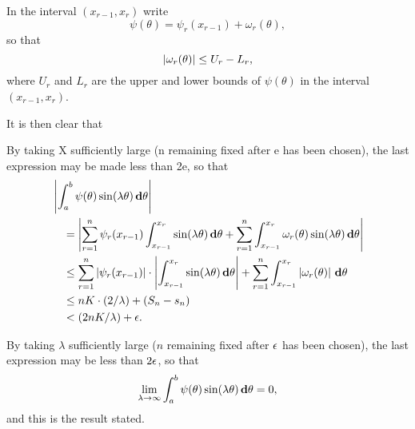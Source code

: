 In the interval $(x_{r-1}, x_{r})$ write
$$
\psi(\theta) = \psi_{r}(x_{r-1}) + \omega_{r}(\theta),
$$
so that
$$
\left|  \omega_{r}(\theta)  \right| \leq U_{r} - L_{r},
$$
where $U_{r}$ and $L_{r}$ are the upper and lower bounds of
$\psi(\theta)$ in the interval
$(x_{r-1}, x_{r})$.

It is then clear that

By taking X sufficiently large (n remaining fixed after e has been
chosen), the last expression may be made less than 2e, so that
\begin{align*}
  &
  \left| 
    \int_{a}^{b}
    \psi(\theta) \sin(\lambda \theta) \, \mathbf{d} \theta
   \right|
  \\
  & \quad
  =
  \left| 
    \sum_{r=1}^{n}
    \psi_{r}(x_{r-1})
    \int_{x_{r-1}}^{x_{r}}
    \sin (\lambda \theta) \, \mathbf{d} \theta
    +
    \sum_{r=1}^{n}
    \int_{x_{r-1}}^{x_{r}}
    \omega_{r}(\theta) \sin(\lambda \theta) \, \mathbf{d} \theta
   \right|
  \\
  & \quad
  \leq
  \sum_{r=1}^{n}
  \left| 
    \psi_{r}(x_{r-1})
   \right|
  \cdot
  \left| 
    \int_{x_{r-1}}^{x_{r}}
    \sin (\lambda \theta) \, \mathbf{d} \theta
   \right|
  +
  \sum_{r=1}^{n}
  \int_{x_{r-1}}^{x_{r}}
  \left|  \omega_{r} (\theta) \right| \, \mathbf{d} \theta
  \\
  & \quad
  \leq n K \cdot (2 / \lambda)
  +
  (S_{n} - s_{n})
  \\
  & \quad
  < (2nK / \lambda)
  +
  \epsilon.
\end{align*}

By taking $\lambda$ sufficiently large ($n$ remaining fixed after $\epsilon$ has been
chosen), the last expression may be less than $2\epsilon$, so that
$$
\lim_{\lambda \rightarrow \infty}
\int_{a}^{b} \psi(\theta) \sin(\lambda \theta) \, \mathbf{d} \theta = 0,
$$
and this is the result stated.

